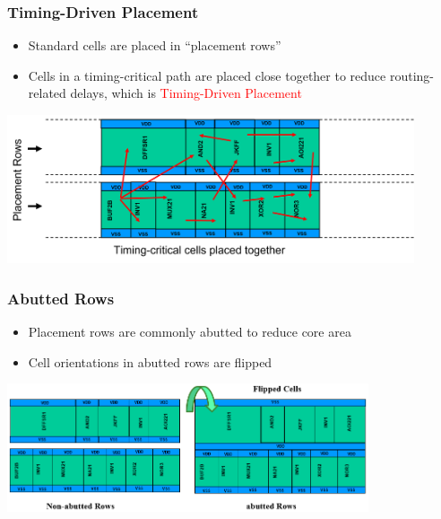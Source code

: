 \documentclass[compress]{beamer}
\begin{document}
\begin{frame}
	\frametitle{Timing-Driven Placement}
	\begin{itemize}
		\item Standard cells are placed in “placement rows”
		\item Cells in a timing-critical path are placed close together to reduce routing-related delays, which is \textcolor{red}{Timing-Driven Placement}
	\end{itemize}
	\begin{center}
		\includegraphics[width=0.9\textwidth]{TDP}
	\end{center}
\end{frame}
	\begin{frame}
		\frametitle{Abutted Rows}
		\begin{itemize}
			\item Placement rows are
			commonly abutted to reduce core area
			\item Cell orientations in abutted
			rows are flipped
		\end{itemize}
		\begin{center}
			\includegraphics[width=0.8\textwidth]{CELL}
		\end{center}
	\end{frame}
\end{document}
